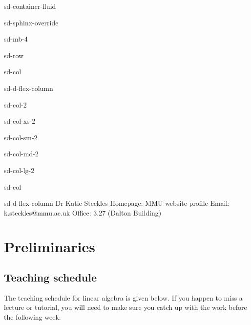 \documentclass[letterpaper,10pt,english]{jupyterBook}
\let\sphinxpxdimen\pdfpxdimen\else\newdimen\sphinxpxdimen
\begin{document}
\begin{sphinxuseclass}{sd-container-fluid}
\begin{sphinxuseclass}{sd-sphinx-override}
\begin{sphinxuseclass}{sd-mb-4}
\begin{sphinxuseclass}{sd-row}
\begin{sphinxuseclass}{sd-col}
\begin{sphinxuseclass}{sd-d-flex-column}
\begin{sphinxuseclass}{sd-col-2}
\begin{sphinxuseclass}{sd-col-xs-2}
\begin{sphinxuseclass}{sd-col-sm-2}
\begin{sphinxuseclass}{sd-col-md-2}
\begin{sphinxuseclass}{sd-col-lg-2}
\noindent{\sphinxincludegraphics[width=125\sphinxpxdimen]{{katie_steckles}.jpg}\hspace*{\fill}}

\end{sphinxuseclass}
\end{sphinxuseclass}
\end{sphinxuseclass}
\end{sphinxuseclass}
\end{sphinxuseclass}
\end{sphinxuseclass}
\end{sphinxuseclass}
\begin{sphinxuseclass}{sd-col}
\begin{sphinxuseclass}{sd-d-flex-column}
\sphinxAtStartPar
Dr Katie Steckles 
Homepage: MMU website profile 
Email: k.steckles@mmu.ac.uk 
Office: 3.27 (Dalton Building)

\end{sphinxuseclass}
\end{sphinxuseclass}
\end{sphinxuseclass}
\end{sphinxuseclass}
\end{sphinxuseclass}
\end{sphinxuseclass}
\sphinxstepscope


\part{Preliminaries}

\sphinxstepscope


\chapter{Teaching schedule}
\label{\detokenize{_pages/0.1_Teaching_schedule:teaching-schedule}}\label{\detokenize{_pages/0.1_Teaching_schedule::doc}}
\sphinxAtStartPar
The teaching schedule for linear algebra is given below. If you happen to miss a lecture or tutorial, you will need to make sure you catch up with the work before the following week.
\end{document}
